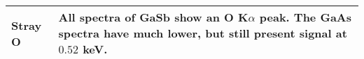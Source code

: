 \begin{table}[phtb]
\begin{center}
\begin{tabular}{p{3.5cm}p{11.1cm}}
			Stray O                                          & All spectra of GaSb show an O K$\alpha$ peak. The GaAs spectra have much lower, but still present signal at $0.52$ keV.                                                                                                                                                                                                                                                                                                                                   \\
			\hline
		\end{tabular}
	\end{center}
\end{table}
